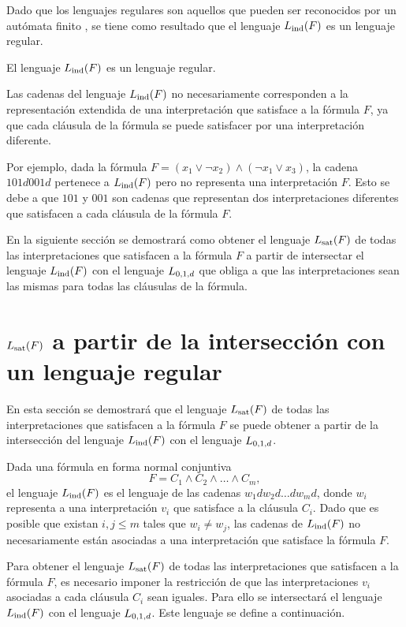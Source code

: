 Dado que los lenguajes regulares son aquellos que pueden ser reconocidos por un autómata finito \cite{automataTheory}, se tiene como resultado que el lenguaje $L_{\mathrm{ind}}(F)$ es un lenguaje regular.

\begin{corollary}
    El lenguaje $L_{\mathrm{ind}}(F)$ es un lenguaje regular.
\end{corollary}

Las cadenas del lenguaje $L_{\mathrm{ind}}(F)$ no necesariamente corresponden a la representación extendida de una interpretación que satisface a la fórmula $F$, ya que cada cláusula de la fórmula se puede satisfacer por una interpretación diferente.

Por ejemplo, dada la fórmula $F = (x_1 \lor \neg x_2) \land (\neg x_1 \lor x_3)$, la cadena $101d001d$ pertenece a $L_{\mathrm{ind}}(F)$ pero no representa una interpretación $F$. Esto se debe a que $101$ y $001$ son cadenas que representan dos interpretaciones diferentes que satisfacen a cada cláusula de la fórmula $F$.

En la siguiente sección se demostrará como obtener el lenguaje $L_{\mathrm{sat}}(F)$ de todas las interpretaciones que satisfacen a la fórmula $F$ a partir de intersectar el lenguaje $L_{\mathrm{ind}}(F)$ con el lenguaje $L_{0,1,d}$ que obliga a que las interpretaciones sean las mismas para todas las cláusulas de la fórmula.

\section{$L_{\mathrm{sat}}(F)$ a partir de la intersección con un lenguaje regular}
\label{sec:intersec-wplus}

En esta sección se demostrará que el lenguaje $L_{\mathrm{sat}}(F)$ de todas las interpretaciones que satisfacen a la fórmula $F$ se puede obtener a partir de la intersección del lenguaje $L_{\mathrm{ind}}(F)$ con el lenguaje $L_{0,1,d}$.

Dada una fórmula en forma normal conjuntiva
$$
    F = C_1 \land C_2 \land \ldots \land C_m,
$$
el lenguaje $L_{\mathrm{ind}}(F)$ es el lenguaje de las cadenas $w_1d w_2d \ldots d w_md$, donde $w_i$ representa a una interpretación $v_i$ que satisface a la cláusula $C_i$. Dado que es posible que existan $i, j \leq m$ tales que $w_i \neq w_j$, las cadenas de $L_{\mathrm{ind}}(F)$ no necesariamente están asociadas a una interpretación que satisface la fórmula $F$.

Para obtener el lenguaje $L_{\mathrm{sat}}(F)$ de todas las interpretaciones que satisfacen a la fórmula $F$, es necesario imponer la restricción de que las interpretaciones $v_i$ asociadas a cada cláusula $C_i$ sean iguales. Para ello se intersectará el lenguaje $L_{\mathrm{ind}}(F)$ con el lenguaje $L_{0,1,d}$. Este lenguaje se define a continuación.

